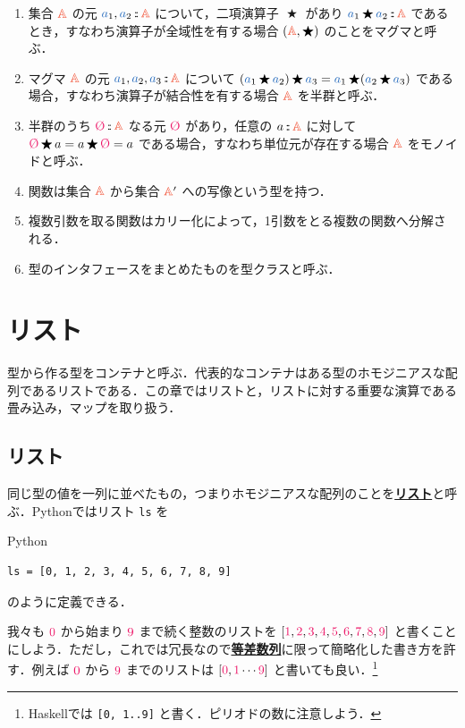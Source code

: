 \documentclass[a5paper,twoside,fleqn,draft]{jsbook}
\def\constantColor{WildStrawberry}
\def\varColor{NavyBlue}
\def\typeColor{RedOrange}
\newcommand{\programminglanguage}[1]{\textsf{#1}}
\newcommand{\haskell}{\programminglanguage{Haskell}}
\newcommand{\python}{\programminglanguage{Python}}
\newenvironment{leader}{\begingroup\gt}{\endgroup}
\newcommand{\keyword}[1]{{\underline{\textbf{#1}}}}
\newcommand{\code}[1]{\texttt{#1}}
\newenvironment{pythoncode}{\begin{itembox}[r]{\python}}{\end{itembox}}
\newcommand{\mConstant}[1]{\textcolor{\constantColor}{#1}}
\newcommand{\mSpecialConstant}[1]{\textcolor{\constantColor}{\textrm{#1}}}
\newcommand{\mZeroNumber}{{\mConstant{0}}}
\newcommand{\mOneNumber}{{\mConstant{1}}}
\newcommand{\mTwoNumber}{\mConstant{2}}
\newcommand{\mThreeNumber}{\mConstant{3}}
\newcommand{\mFourNumber}{\mConstant{4}}
\newcommand{\mFiveNumber}{\mConstant{5}}
\newcommand{\mSixNumber}{\mConstant{6}}
\newcommand{\mSevenNumber}{\mConstant{7}}
\newcommand{\mEightNumber}{\mConstant{8}}
\newcommand{\mNineNumber}{\mConstant{9}}
\newcommand{\mZero}{\mSpecialConstant{\O}}
\newcommand{\mVar}[1]{\textcolor{\varColor}{#1}}
\newcommand{\mAVar}{{\mVar{a}}}
\DeclareMathOperator{\mBinOp}{\bigstar}
\DeclareMathOperator{\mIn}{{:\!:}}
\newcommand{\mSpecialSet}[1]{\textcolor{\typeColor}{\mathbb{#1}}}
\newcommand{\mASet}{\mSpecialSet{A}}
\begin{document}
\begin{enumerate}
\item 集合 $\mASet$ の元 $\mAVar_1,\mAVar_2\mIn\mASet$ について，二項演算子 $\mBinOp$ があり $\mAVar_1\mBinOp \mAVar_2\mIn\mASet$ であるとき，すなわち演算子が全域性を有する場合 $(\mASet,\mBinOp)$ のことをマグマと呼ぶ．
\item マグマ $\mASet$ の元 $\mAVar_1,\mAVar_2,\mAVar_3\mIn\mASet$ について $(\mAVar_1\mBinOp \mAVar_2)\mBinOp \mAVar_3=\mAVar_1\mBinOp(\mAVar_2\mBinOp \mAVar_3)$ である場合，すなわち演算子が結合性を有する場合 $\mASet$ を半群と呼ぶ．
\item 半群のうち $\mZero\mIn\mASet$ なる元 $\mZero$ があり，任意の $a\mIn\mASet$ に対して $\mZero\mBinOp a=a\mBinOp\mZero=a$ である場合，すなわち単位元が存在する場合 $\mASet$ をモノイドと呼ぶ．
\item 関数は集合 $\mASet$ から集合 $\mASet'$ への写像という型を持つ．
\item 複数引数を取る関数はカリー化によって，1引数をとる複数の関数へ分解される．
\item 型のインタフェースをまとめたものを型クラスと呼ぶ．
\end{enumerate}

\chapter{リスト}
\label{ch:list}

\begin{leader}
型から作る型をコンテナと呼ぶ．代表的なコンテナはある型のホモジニアスな配列であるリストである．この章ではリストと，リストに対する重要な演算である畳み込み，マップを取り扱う．
\end{leader}

\section{リスト}

同じ型の値を一列に並べたもの，つまりホモジニアスな配列のことを\keyword{リスト}と呼ぶ．\python ではリスト \code{ls} を
\begin{pythoncode}
\begin{verbatim}
ls = [0, 1, 2, 3, 4, 5, 6, 7, 8, 9]
\end{verbatim}
\end{pythoncode}
のように定義できる．

我々も $\mZeroNumber$ から始まり $\mNineNumber$ まで続く整数のリストを $[\mOneNumber,\mTwoNumber,\mThreeNumber,\mFourNumber,\mFiveNumber,\mSixNumber,\mSevenNumber,\mEightNumber,\mNineNumber]$ と書くことにしよう．ただし，これでは冗長なので\keyword{等差数列}に限って簡略化した書き方を許す．例えば $\mZeroNumber$ から $\mNineNumber$ までのリストは $[\mZeroNumber,\mOneNumber\dotsb\mNineNumber]$ と書いても良い．\footnote{\haskell では \code{[0, 1..9]} と書く．ピリオドの数に注意しよう．}
\end{document}
